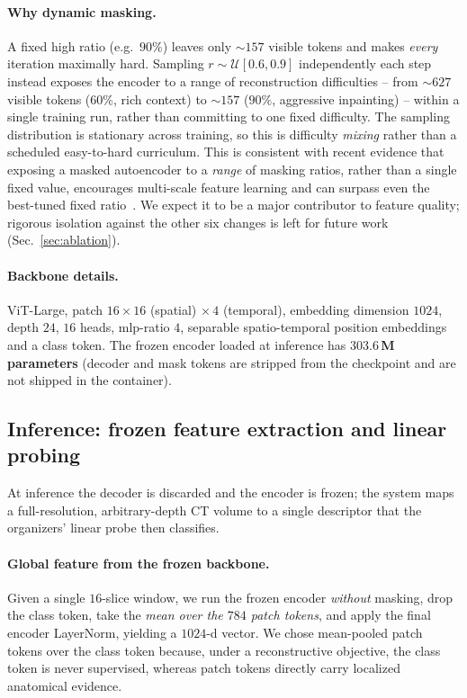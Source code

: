 \documentclass[runningheads]{llncs}
\begin{document}
\paragraph{Why dynamic masking.}
A fixed high ratio (e.g.\ $90\%$) leaves only $\sim\!157$ visible
tokens and makes \emph{every} iteration maximally hard. Sampling
$r\sim\mathcal{U}[0.6,0.9]$ independently each step instead exposes the encoder
to a range of reconstruction difficulties -- from $\sim\!627$ visible tokens
($60\%$, rich context) to $\sim\!157$ ($90\%$, aggressive inpainting) -- within a
single training run, rather than committing to one fixed difficulty. The
sampling distribution is stationary across training, so this is difficulty
\emph{mixing} rather than a scheduled easy-to-hard curriculum. This is
consistent with recent evidence that exposing a masked autoencoder to a
\emph{range} of masking ratios, rather than a single fixed value, encourages
multi-scale feature learning and can surpass even the best-tuned fixed
ratio~\cite{r2mae}. We expect it to be a major contributor to feature quality;
rigorous isolation against the other six changes is left for future work
(Sec.~\ref{sec:ablation}).

\paragraph{Backbone details.}
ViT-Large, patch $16{\times}16$ (spatial) $\times\,4$ (temporal), embedding
dimension $1024$, depth $24$, $16$ heads, mlp-ratio $4$, separable
spatio-temporal position embeddings and a class token. The frozen encoder loaded
at inference has \textbf{$303.6$\,M parameters} (decoder and mask tokens are
stripped from the checkpoint and are not shipped in the container).

\subsection{Inference: frozen feature extraction and linear probing}
\label{sec:inference}
At inference the decoder is discarded and the encoder is frozen; the system maps
a full-resolution, arbitrary-depth CT volume to a single descriptor that the
organizers' linear probe then classifies.

\paragraph{Global feature from the frozen backbone.}
Given a single $16$-slice
window, we run the frozen encoder \emph{without} masking, drop the class token, take the
\emph{mean over the $784$ patch tokens}, and apply the final encoder
LayerNorm, yielding a $1024$-d vector. We chose mean-pooled patch tokens over the
class token because, under a reconstructive objective, the class token is never
supervised, whereas patch tokens directly carry localized anatomical evidence.
\end{document}
